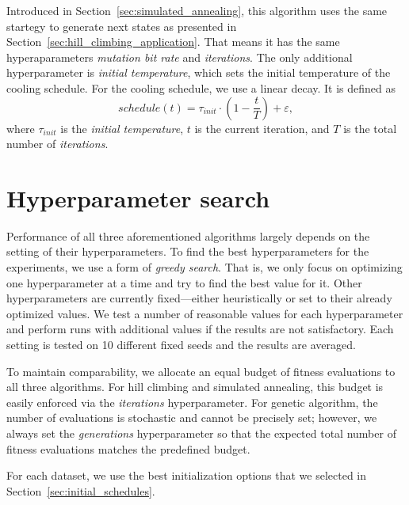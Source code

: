 Introduced in Section~\ref{sec:simulated_annealing}, this algorithm uses the same startegy to generate next states as presented in Section~\ref{sec:hill_climbing_application}. That means it has the same hyperaparameters \textit{mutation bit rate} and \textit{iterations}. The only additional hyperparameter is \textit{initial temperature}, which sets the initial temperature of the cooling schedule. For the cooling schedule, we use a linear decay. It is defined as
\begin{equation}
    schedule(t) = \tau_{init} \cdot \left(1 - \frac{t}{T}\right) + \varepsilon,
\end{equation}
where $\tau_{init}$ is the \textit{initial temperature}, $t$ is the current iteration, and $T$ is the total number of \textit{iterations}.

\section{Hyperparameter search} \label{sec:hyperparameter_search}

Performance of all three aforementioned algorithms largely depends on the setting of their hyperparameters.
To find the best hyperparameters for the experiments, we use a form of \textit{greedy search}. That is, we only focus on optimizing one hyperparameter at a time and try to find the best value for it. Other hyperparameters are currently fixed---either heuristically or set to their already optimized values.
We test a number of reasonable values for each hyperparameter and perform runs with additional values if the results are not satisfactory.
Each setting is tested on 10 different fixed seeds and the results are averaged.

To maintain comparability, we allocate an equal budget of fitness evaluations to all three algorithms. For hill climbing and simulated annealing, this budget is easily enforced via the \textit{iterations} hyperparameter. For genetic algorithm, the number of evaluations is stochastic and cannot be precisely set; however, we always set the \textit{generations} hyperparameter so that the expected total number of fitness evaluations matches the predefined budget.

For each dataset, we use the best initialization options that we selected in Section~\ref{sec:initial_schedules}.

